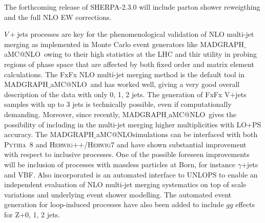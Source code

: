 \documentclass[a4paper,11pt,notoc]{article}
\makeatletter
\newcommand{\PYTHIA}{\textsc{Pythia}}
\newcommand{\HERWIG}{\textsc{Herwig}}
\newcommand{\MGNLO}{MADGRAPH$\_$aMC@NLO}
\makeatother
\begin{document}
The forthcoming release of SHERPA-2.3.0 will include parton shower reweigthing and the full NLO EW corrections.

$V+$jets processes are key for the phenomenological validation of NLO multi-jet merging as implemented in Monte Carlo event generators like \MGNLO\, owing to their high statistics at the LHC and thir utility in probing regions of phase space that are affected by both fixed order and matrix element calculations. The FxFx NLO multi-jet merging method is the default tool in \MGNLO\ and has worked well, giving a very good overall description of the data with only 0, 1, 2 jets. 
The generation of FxFx V+jets samples with up to 3 jets is technically possible,
even if computationally demanding. Moreover, since recently, \MGNLO\, gives the
possibility of including in the multi-jet merging higher multiplicities with
LO+PS accuracy.
The \MGNLO simulations can be interfaced with both \PYTHIA\ 8 and \HERWIG++/\HERWIG7 and have shown substantial improvement with respect to inclusive processes. One of the possible foreseen improvements will be inclusion of processes with massless particles at Born, for instance $\gamma$+jets and VBF. Also incorporated is an automated interface to UNLOPS to enable an independent evaluation of NLO multi-jet merging systematics on top of scale variations and underlying event shower modelling. The automated event generation for loop-induced processes have also been added to include $gg$ effects for Z+0, 1, 2 jets.
\end{document}
